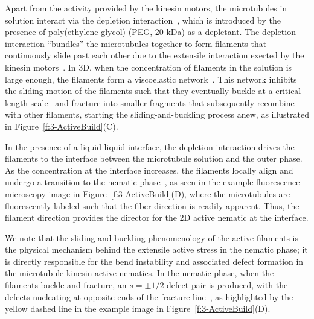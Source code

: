 Apart from the activity provided by the kinesin motors, the microtubules in solution interact via the depletion interaction~\cite{RN251}, which is introduced by the presence of poly(ethylene glycol) (PEG, 20 kDa) as a depletant.
The depletion interaction ``bundles'' the microtubules together to form filaments that continuously slide past each other due to the extensile interaction exerted by the kinesin motors~\cite{RN244,RN4,RN3}.
In 3D, when the concentration of filaments in the solution is large enough, the filaments form a viscoelastic network~\cite{RN253,RN3}.
This network inhibits the sliding motion of the filaments such that they eventually buckle at a critical length scale~\cite{RN253,RN3} and fracture into smaller fragments that subsequently recombine with other filaments, starting the sliding-and-buckling process anew, as illustrated in Figure~\ref{f:3-ActiveBuild}(C).

In the presence of a liquid-liquid interface, the depletion interaction drives the filaments to the interface between the microtubule solution and the outer phase.
As the concentration at the interface increases, the filaments locally align and undergo a transition to the nematic phase~\cite{RN3,RN135,RN134}, as seen in the example fluorescence microscopy image in Figure~\ref{f:3-ActiveBuild}(D), where the microtubules are fluorescently labeled such that the fiber direction is readily apparent.
Thus, the filament direction provides the director for the 2D active nematic at the interface.

We note that the sliding-and-buckling phenomenology of the active filaments is the physical mechanism behind the extensile active stress in the nematic phase; it is directly responsible for the bend instability and associated defect formation in the microtubule-kinesin active nematics.
In the nematic phase, when the filaments buckle and fracture, an $s =  \pm 1/2$ defect pair is produced, with the defects nucleating at opposite ends of the fracture line~\cite{RN3,RN11}, as highlighted by the yellow dashed line in the example image in Figure~\ref{f:3-ActiveBuild}(D).

